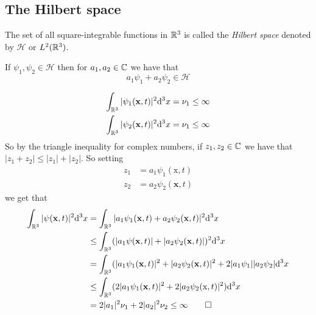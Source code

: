 \documentclass{article}
\begin{document}
\subsection{The Hilbert space}
The set of all square-integrable functions in $ \mathbb{R}^3 $ is called the \textit{Hilbert space} denoted by $ \mathcal H $ or $ L^2(\mathbb{R}^3) $.\par
\begin{theorem}
  If $ \psi_1,\psi_2\in\mathcal H $ then for $ a_1,a_2\in \mathbb{C} $ we have that 
  \[
    a_1\psi_1+a_2\psi_2\in\mathcal H
  \]
\end{theorem}
\pf 
\begin{align*}
	\int_{\R^3}|\psi_1(\mathbf x,t)|^2\mathrm d^3x=\nu_1\le\infty\\
	\int_{\R^3}|\psi_2(\mathbf x,t)|^2\mathrm d^3x=\nu_1\le\infty


\end{align*}
So by the triangle inequality for complex numbers, if $ z_1,z_2\in \mathbb{C} $ we have that $ |z_1+z_2|\le|z_1|+|z_2| $. So setting
\begin{align*}
	z_1&=a_1\psi_1(\mathrm x,t) \\
	z_2&=a_2\psi_2(\mathbf x,t)
\end{align*}
we get that
\begin{align*}
	\int_{\mathbb{R}^3}|\psi(\mathbf x,t)|^2\mathrm d^3x&=\int_{\mathbb{R}^3}|a_1\psi_1(\mathbf x,t)+a_2\psi_2(\mathbf x,t)|^2\mathrm d^3x\\
						    &\le \int_{\mathbb{R}^3}(|a_1\psi(\mathbf x,t)|+|a_2\psi_2(\mathbf x ,t)|)^2\mathrm d^3x\\
						    &= \int_{\mathbb{R}^3}(|a_1\psi_1(\mathbf x,t)|^2+|a_2\psi_2(\mathbf x,t)|^2+2|a_1\psi_1||a_2\psi_2|\mathrm d^3x\\
						    &\le \int_{\mathbb{R}^3}(2|a_1\psi_1(\mathbf x,t)|^2+2|a_2\psi_2(\mathrm x,t)|^2)\mathrm d^3x\\
						    &= 2|a_1|^2\nu_1+2|a_2|^2\nu_2\le \infty\qed
\end{align*}
\end{document}
